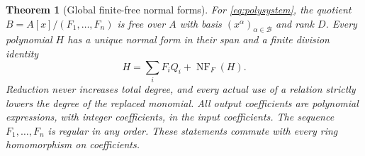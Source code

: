 \documentclass[11pt,letterpaper,oneside]{article}
\numberwithin{equation}{section}
\newtheorem{theorem}{Theorem}[section]
\theoremstyle{definition}
\theoremstyle{remark}\newtheorem{remark}[theorem]{Remark}
\newcommand{\NF}{\operatorname{NF}}\newcommand{\Tr}{\operatorname{Tr}}
\begin{document}
\begin{theorem}[Global finite-free normal forms]\label{thm:globalfree}
For \eqref{eq:polysystem}, the quotient
$B=A[x]/(F_1,\ldots,F_n)$ is free over $A$ with basis
$(x^\alpha)_{\alpha\in\mathcal B}$ and rank $D$. Every polynomial $H$
has a unique normal form in their span and a finite division identity
\begin{equation}\label{eq:globalnf}
 H=\sum_iF_iQ_i+\NF_F(H).
\end{equation}
Reduction never increases total degree, and every actual use of a
relation strictly lowers the degree of the replaced monomial. All output
coefficients are polynomial expressions, with integer coefficients, in
the input coefficients. The sequence $F_1,\ldots,F_n$ is regular in
any order. These statements commute with every ring homomorphism on
coefficients.
\end{theorem}
\end{document}
